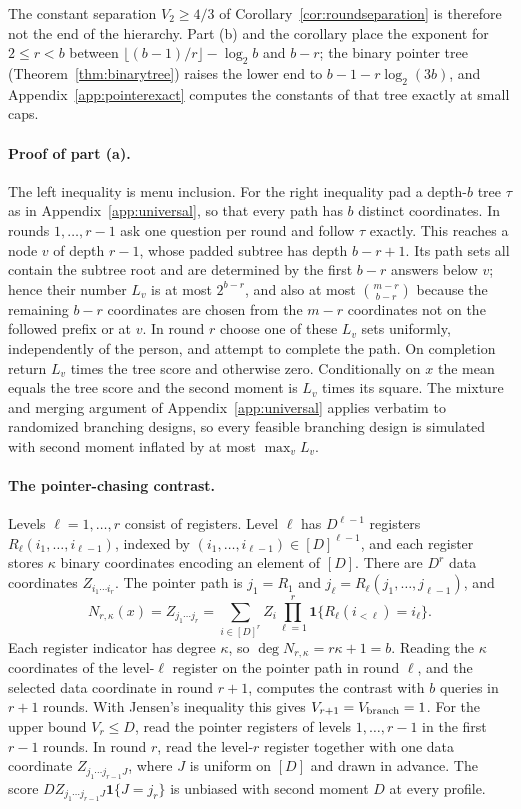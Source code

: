 The constant separation $V_2\ge4/3$ of Corollary~\ref{cor:roundseparation}
is therefore not the end of the hierarchy. Part (b) and the corollary place
the exponent for $2\le r<b$ between $\lfloor(b-1)/r\rfloor-\log_2b$ and $b-r$;
the binary pointer tree (Theorem~\ref{thm:binarytree}) raises the lower end to
$b-1-r\log_2(3b)$, and Appendix~\ref{app:pointerexact} computes the constants of
that tree exactly at small caps.

\paragraph{Proof of part (a).}
The left inequality is menu inclusion. For the right inequality pad a
depth-$b$ tree $\tau$ as in Appendix~\ref{app:universal}, so that every path
has $b$ distinct coordinates. In rounds $1,\ldots,r-1$ ask one question per
round and follow $\tau$ exactly. This reaches a node $v$ of depth $r-1$,
whose padded subtree has depth $b-r+1$. Its path sets all contain the subtree
root and are determined by the first $b-r$ answers below $v$; hence their
number $L_v$ is at most $2^{b-r}$, and also at most $\binom{m-r}{b-r}$
because the remaining $b-r$ coordinates are chosen from the $m-r$
coordinates not on the followed prefix or at $v$. In round $r$ choose one of
these $L_v$ sets uniformly, independently of the person, and attempt to
complete the path. On completion return $L_v$ times the tree score and
otherwise zero. Conditionally on $x$ the mean equals the tree score and the
second moment is $L_v$ times its square. The mixture and merging argument of
Appendix~\ref{app:universal} applies verbatim to randomized branching
designs, so every feasible branching design is simulated with second
moment inflated by at most $\max_vL_v$.

\paragraph{The pointer-chasing contrast.}
Levels $\ell=1,\ldots,r$ consist of registers. Level $\ell$ has $D^{\ell-1}$
registers $R_\ell(i_1,\ldots,i_{\ell-1})$, indexed by
$(i_1,\ldots,i_{\ell-1})\in[D]^{\ell-1}$, and each register stores $\kappa$
binary coordinates encoding an element of $[D]$. There are $D^r$ data
coordinates $Z_{i_1\cdots i_r}$. The pointer path is $j_1=R_1$ and
$j_\ell=R_\ell(j_1,\ldots,j_{\ell-1})$, and
\[
 N_{r,\kappa}(x)=Z_{j_1\cdots j_r}
 =\sum_{i\in[D]^r}Z_i\prod_{\ell=1}^r\mathbf 1\{R_\ell(i_{<\ell})=i_\ell\}.
\]
Each register indicator has degree $\kappa$, so $\deg N_{r,\kappa}=r\kappa+1=b$.
Reading the $\kappa$ coordinates of the level-$\ell$ register on the pointer
path in round $\ell$, and the selected data coordinate in round $r+1$,
computes the contrast with $b$ queries in $r+1$ rounds. With Jensen's
inequality this gives $V_{r+1}=V_{\rm branch}=1$. For the upper bound
$V_r\le D$, read the pointer registers of levels $1,\ldots,r-1$ in the first
$r-1$ rounds. In round $r$, read the level-$r$ register together with one
data coordinate $Z_{j_1\cdots j_{r-1}J}$, where $J$ is uniform on $[D]$ and
drawn in advance. The score $DZ_{j_1\cdots j_{r-1}J}\mathbf 1\{J=j_r\}$ is
unbiased with second moment $D$ at every profile.

